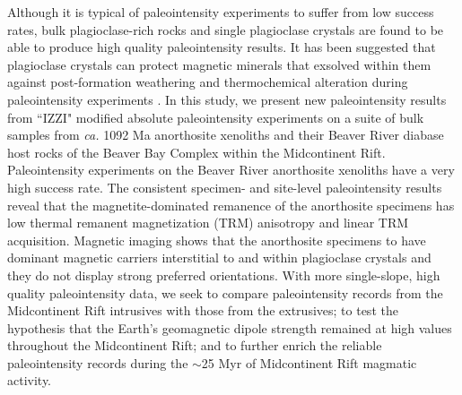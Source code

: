\documentclass[draft]{agujournal2019}
\begin{document}
Although it is typical of paleointensity experiments to suffer from low success rates, bulk plagioclase-rich rocks \cite{Selkin2000a} and single plagioclase crystals \cite{Tarduno2005a} are found to be able to produce high quality paleointensity results. It has been suggested that plagioclase crystals can protect magnetic minerals that exsolved within them against post-formation weathering and thermochemical alteration during paleointensity experiments \cite{Tarduno2005a}. In this study, we present new paleointensity results from ``IZZI" modified absolute paleointensity experiments \cite{Yu2004a} on a suite of bulk samples from \textit{ca.} 1092 Ma anorthosite xenoliths and their Beaver River diabase host rocks of the Beaver Bay Complex within the Midcontinent Rift. Paleointensity experiments on the Beaver River anorthosite xenoliths have a very high success rate. The consistent specimen- and site-level paleointensity results reveal that the magnetite-dominated remanence of the anorthosite specimens has low thermal remanent magnetization (TRM) anisotropy and linear TRM acquisition. Magnetic imaging shows that the anorthosite specimens to have dominant magnetic carriers interstitial to and within plagioclase crystals and they do not display strong preferred orientations. With more single-slope, high quality paleointensity data, we seek to compare paleointensity records from the Midcontinent Rift intrusives with those from the extrusives; to test the hypothesis that the Earth's geomagnetic dipole strength remained at high values throughout the Midcontinent Rift; and to further enrich the reliable paleointensity records during the $\sim$25 Myr of Midcontinent Rift magmatic activity. 

\end{document}
